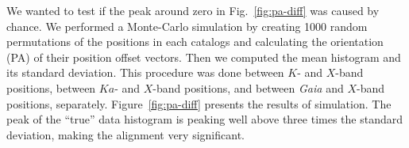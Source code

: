 \documentclass{aa}
\begin{document}



     We wanted to test if the peak around zero in Fig.~\ref{fig:pa-diff} was caused by chance.
     We performed a Monte-Carlo simulation by creating 1000 random permutations of the positions in each catalogs and calculating the orientation (PA) of their position offset vectors.
     Then we computed the mean histogram and its standard deviation.
     This procedure was done between $K$- and $X$-band positions, between $Ka$- and $X$-band positions, and between \textit{Gaia} and $X$-band positions, separately.
     Figure~\ref{fig:pa-diff} presents the results of simulation.
     The peak of the ``true'' data histogram is peaking well above three times the standard deviation, making the alignment very significant.

\end{document}
